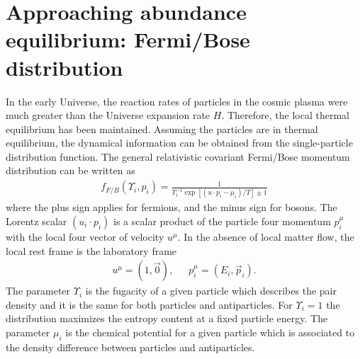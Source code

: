 
\section{Approaching abundance equilibrium: Fermi/Bose distribution}

In the early Universe, the reaction rates of particles in the cosmic plasma were much greater than the Universe expansion rate $H$. Therefore, the local thermal equilibrium has been maintained. Assuming the particles are in thermal equilibrium, the dynamical information can be obtained from the single-particle distribution function. The general relativistic covariant Fermi/Bose momentum distribution can be written as
\begin{align}
f_{F/B}(\Upsilon_i,p_i)=\frac{1}{\Upsilon^{-1}_i\exp{\left[(u\cdot p_i-\mu_i)/T\right]}\pm1}
\end{align}
where the plus sign applies for fermions, and the minus sign for bosons. The Lorentz scalar $(u_i\cdot p_i)$ is a scalar product of the particle four momentum $p^\mu_i$ with the local four vector of velocity $u^\mu$. In the absence of local matter flow, the local rest frame is the laboratory frame 
\begin{align}
u^\mu=\left(1,\vec{0}\right),\,\,\,\,\,\,\,\,\, p^\mu_i=\left(E_i,\vec{p}_i\right).
\end{align}  
The parameter $\Upsilon_i$ is the fugacity of a given particle which describes the pair density and it is the same for both particles and antiparticles. For $\Upsilon_i=1$ the distribution maximizes the entropy content at a fixed particle energy. The parameter $\mu_i$ is the chemical potential for a given particle which is associated to the density difference between particles and antiparticles. 

